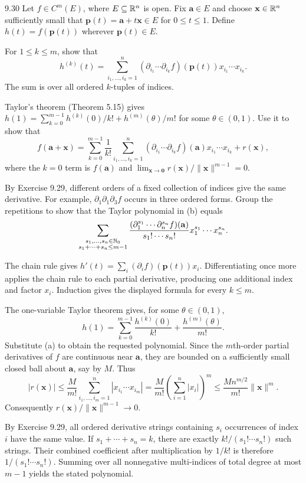 \documentclass[11pt,oneside]{article}
\begin{document}
\begin{exercise}{9.30}
Let $f\in C^m(E)$, where $E\subseteq\mathbb{R}^n$ is open. Fix $\mathbf a\in E$ and choose $\mathbf x\in\mathbb{R}^n$ sufficiently small that $\mathbf p(t)=\mathbf a+t\mathbf x\in E$ for $0\le t\le1$. Define $h(t)=f(\mathbf p(t))$ wherever $\mathbf p(t)\in E$.
\begin{exercisesubparts}
\item For $1\le k\le m$, show that
\[
 h^{(k)}(t)=\sum_{i_1,\ldots,i_k=1}^n
 (\partial_{i_1}\cdots\partial_{i_k}f)(\mathbf p(t))
 x_{i_1}\cdots x_{i_k}.
\]
The sum is over all ordered $k$-tuples of indices.
\item Taylor's theorem (Theorem 5.15) gives $h(1)=\sum_{k=0}^{m-1}h^{(k)}(0)/k!+h^{(m)}(\theta)/m!$ for some $\theta\in(0,1)$. Use it to show that
\[
 f(\mathbf a+\mathbf x)
 =\sum_{k=0}^{m-1}\frac1{k!}
 \sum_{i_1,\ldots,i_k=1}^n
 (\partial_{i_1}\cdots\partial_{i_k}f)(\mathbf a)
 x_{i_1}\cdots x_{i_k}+r(\mathbf x),
\]
where the $k=0$ term is $f(\mathbf a)$ and
$\lim_{\mathbf x\to\mathbf0}r(\mathbf x)/\|\mathbf x\|^{m-1}=0$.
\item By Exercise 9.29, different orders of a fixed collection of indices give the same derivative. For example, $\partial_1\partial_1\partial_3f$ occurs in three ordered forms. Group the repetitions to show that the Taylor polynomial in (b) equals
\[
 \sum_{\substack{s_1,\ldots,s_n\in\mathbb{N}_0\\s_1+\cdots+s_n\le m-1}}
 \frac{(\partial_1^{s_1}\cdots\partial_n^{s_n}f)(\mathbf a)}{s_1!\cdots s_n!}
 x_1^{s_1}\cdots x_n^{s_n}.
\]
\end{exercisesubparts}
\end{exercise}
\begin{solution}
\begin{exercisesubparts}
\item The chain rule gives $h'(t)=\sum_i(\partial_if)(\mathbf p(t))x_i$. Differentiating once more applies the chain rule to each partial derivative, producing one additional index and factor $x_i$. Induction gives the displayed formula for every $k\le m$.
\item The one-variable Taylor theorem gives, for some $\theta\in(0,1)$,
\[
 h(1)=\sum_{k=0}^{m-1}\frac{h^{(k)}(0)}{k!}
       +\frac{h^{(m)}(\theta)}{m!}.
\]
Substitute (a) to obtain the requested polynomial. Since the $m$th-order partial derivatives of $f$ are continuous near $\mathbf a$, they are bounded on a sufficiently small closed ball about $\mathbf a$, say by $M$. Thus
\[
 |r(\mathbf x)|\le\frac M{m!}\sum_{i_1,\ldots,i_m=1}^n
 |x_{i_1}\cdots x_{i_m}|
 =\frac M{m!}\left(\sum_{i=1}^n|x_i|\right)^m
 \le\frac{Mn^{m/2}}{m!}\|\mathbf x\|^m.
\]
Consequently $r(\mathbf x)/\|\mathbf x\|^{m-1}\to0$.
\item By Exercise 9.29, all ordered derivative strings containing $s_i$ occurrences of index $i$ have the same value. If $s_1+\cdots+s_n=k$, there are exactly
$k!/(s_1!\cdots s_n!)$ such strings. Their combined coefficient after multiplication by $1/k!$ is therefore $1/(s_1!\cdots s_n!)$. Summing over all nonnegative multi-indices of total degree at most $m-1$ yields the stated polynomial.
\end{exercisesubparts}
\end{solution}
\end{document}
